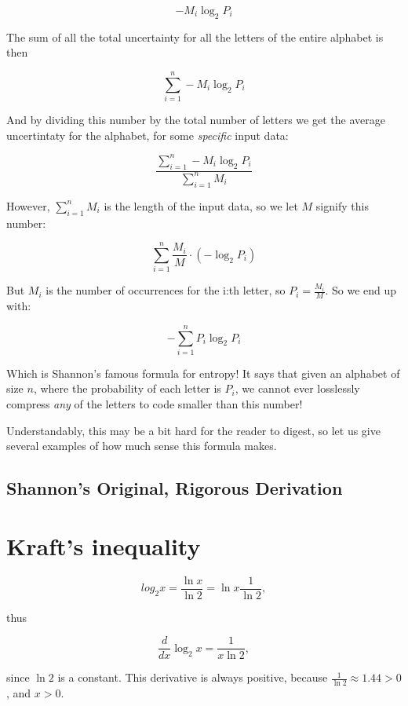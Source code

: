 \begin{equation*}
  -M_i \log_2 P_i
\end{equation*}

The sum of all the total uncertainty for all the letters of the entire
alphabet is then

\begin{equation*}
  \sum_{i=1}^n -M_i \log_2 P_i
\end{equation*}

And by dividing this number by the total number of letters we get the
average uncertintaty for the alphabet, for some \textit{specific}
input data:

\begin{equation*}
  \frac{\sum_{i=1}^n -M_i \log_2 P_i}{\sum_{i=1}^n M_i}
\end{equation*}

However, $\sum_{i=1}^n M_i$ is the length of the input data, so we let
$M$ signify this number:

\begin{equation*}
  \sum_{i=1}^n \frac{M_i}{M} \cdot (-\log_2 P_i)
\end{equation*}

But $M_i$ is the number of occurrences for the i:th letter, so $P_i =
\frac{M_i}{M}$. So we end up with:

\begin{equation}
  \label{eq:entropy}
  -\sum_{i=1}^n P_i \log_2 P_i
\end{equation}

Which is Shannon's famous formula for entropy! It says that given an
alphabet of size $n$, where the probability of each letter is $P_i$,
we cannot ever losslessly compress \textit{any} of the letters to code
smaller than this number!

Understandably, this may be a bit hard for the reader to digest, so
let us give several examples of how much sense this formula makes.

\subsection{Shannon's Original, Rigorous Derivation}

\section{Kraft's inequality}

\answers{}

\begin{Answer}[ref={deriv-log}]

  \begin{equation*}
    log_2 x = \frac{\ln x}{\ln 2} = \ln x \frac{1}{\ln 2},
  \end{equation*}

  thus

  \begin{equation*}
    \frac{d}{dx} \log_2 x = \frac{1}{x\ln 2},
  \end{equation*}

  since $\ln 2$ is a constant. This derivative is always positive,
  because $\frac{1}{\ln 2} \approx 1.44 > 0$, and $x > 0$.
\end{Answer}
